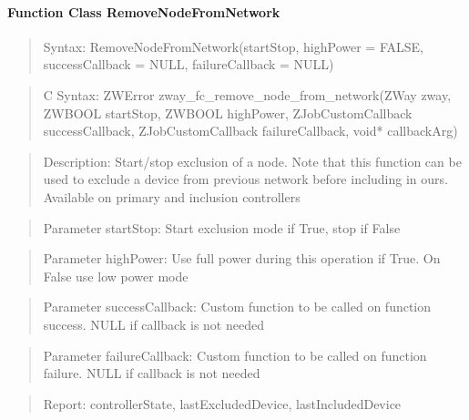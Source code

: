 \paragraph{Function Class RemoveNodeFromNetwork}
\begin{quote}Syntax: RemoveNodeFromNetwork(startStop, highPower = FALSE, successCallback = NULL, failureCallback = NULL)\end{quote}
\begin{quote}C Syntax: ZWError zway\_fc\_remove\_node\_from\_network(ZWay zway, ZWBOOL startStop, ZWBOOL highPower, ZJobCustomCallback successCallback, ZJobCustomCallback failureCallback, void* callbackArg)\end{quote}
\begin{quote}Description: Start/stop exclusion of a node. Note that this function can be used to exclude a device from previous network before including in ours. Available on primary and inclusion controllers\end{quote}
\begin{quote}Parameter startStop: Start exclusion mode if True, stop if False\end{quote}
\begin{quote}Parameter highPower: Use full power during this operation if True. On False use low power mode\end{quote}
\begin{quote}Parameter successCallback: Custom function to be called on function success. NULL if callback is not needed\end{quote}
\begin{quote}Parameter failureCallback: Custom function to be called on function failure. NULL if callback is not needed\end{quote}
\begin{quote}Report: controllerState, lastExcludedDevice, lastIncludedDevice\end{quote}

